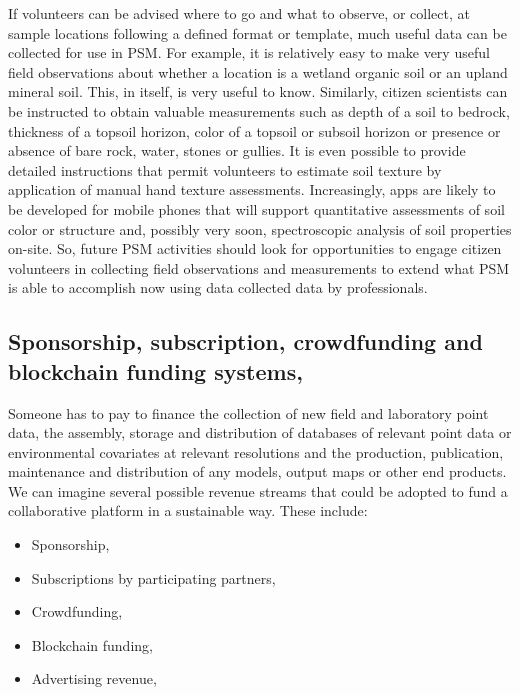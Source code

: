 \documentclass[graybox,natbib,nospthms,UStrade]{svmono}
\begin{document}
If volunteers can be advised where to go and what to observe, or
collect, at sample locations following a defined format or template,
much useful data can be collected for use in PSM. For example, it is
relatively easy to make very useful field observations about whether a
location is a wetland organic soil or an upland mineral soil. This, in
itself, is very useful to know. Similarly, citizen scientists can be
instructed to obtain valuable measurements such as depth of a soil to
bedrock, thickness of a topsoil horizon, color of a topsoil or subsoil
horizon or presence or absence of bare rock, water, stones or gullies.
It is even possible to provide detailed instructions that permit
volunteers to estimate soil texture by application of manual hand
texture assessments. Increasingly, apps are likely to be developed for
mobile phones that will support quantitative assessments of soil color
or structure and, possibly very soon, spectroscopic analysis of soil
properties on-site. So, future PSM activities should look for
opportunities to engage citizen volunteers in collecting field
observations and measurements to extend what PSM is able to accomplish
now using data collected data by professionals.

\hypertarget{sponsorship-subscription-crowdfunding-and-blockchain-funding-systems}{%
\subsection{Sponsorship, subscription, crowdfunding and blockchain funding systems,}\label{sponsorship-subscription-crowdfunding-and-blockchain-funding-systems}}

Someone has to pay to finance the collection of new field and laboratory
point data, the assembly, storage and distribution of databases of
relevant point data or environmental covariates at relevant resolutions
and the production, publication, maintenance and distribution of any
models, output maps or other end products. We can imagine several
possible revenue streams that could be adopted to fund a collaborative
platform in a sustainable way. These include:

\begin{itemize}
\item
  Sponsorship,
\item
  Subscriptions by participating partners,
\item
  Crowdfunding,
\item
  Blockchain funding,
\item
  Advertising revenue,
\end{itemize}
\end{document}
